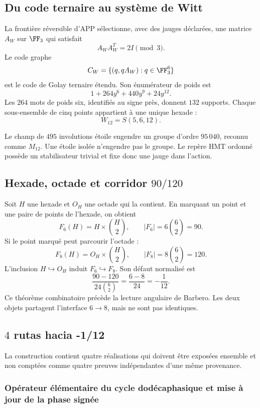\subsection{Du code ternaire au système de Witt}

La frontière réversible d’APP sélectionne, avec des jauges déclarées, une matrice
\(A_W\) sur \(\FF_3\) qui satisfait
\[
A_WA_W^T=2I\pmod3.
\]
Le code graphe
\[
C_W=\{(q,qA_W):q\in\FF_3^6\}
\]
est le code de Golay ternaire étendu. Son énumérateur de poids est
\[
1+264y^6+440y^9+24y^{12}.
\]
Les \(264\) mots de poids six, identifiés au signe près, donnent \(132\)
supports. Chaque sous-ensemble de cinq points appartient à une unique hexade :
\[
W_{12}=S(5,6,12).
\]

Le champ de \(495\) involutions étoile engendre un groupe d’ordre
\(95\,040\), reconnu comme \(M_{12}\). Une étoile isolée n’engendre pas le
groupe. Le repère HMT ordonné possède un stabilisateur trivial et fixe donc une
jauge dans l’action.

\subsection{Hexade, octade et corridor \texorpdfstring{\(90/120\)}{90/120}}

Soit \(H\) une hexade et \(O_H\) une octade qui la contient. En marquant un point
et une paire de points de l’hexade, on obtient
\[
F_6(H)=H\times\binom H2,
\qquad
|F_6|=6\binom62=90.
\]
Si le point marqué peut parcourir l’octade :
\[
F_8(H)=O_H\times\binom H2,
\qquad
|F_8|=8\binom62=120.
\]
L’inclusion \(H\hookrightarrow O_H\) induit \(F_6\hookrightarrow F_8\).
Son défaut normalisé est
\[
\boxed{
\frac{90-120}{24\binom62}
=\frac{6-8}{24}
=-\frac1{12}.}
\]
Ce théorème combinatoire précède la lecture angulaire de Barbero. Les
deux objets partagent l’interface \(6\to8\), mais ne sont pas identiques.

\subsection{\(4\) rutas hacia -1/12}

La construction contient quatre réalisations qui doivent être exposées ensemble et non
comptées comme quatre preuves indépendantes d’une même provenance.

\subsubsection{Opérateur élémentaire du cycle dodécaphasique et mise à jour de la phase signée}

